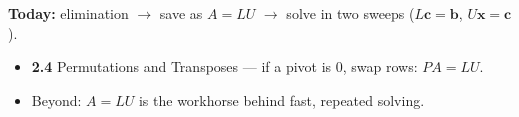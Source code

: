 \documentclass[aspectratio=169, 11pt]{beamer}
\newcommand{\xx}{\mathbf{x}}
\newcommand{\bb}{\mathbf{b}}
\newcommand{\cc}{\mathbf{c}}
\begin{document}
\begin{frame}[t, plain]
  \textbf{Today:} elimination $\to$ save as $A=LU$ $\to$ solve in two sweeps ($L\cc=\bb$, $U\xx=\cc$).\\[8pt]
  \begin{itemize}
    \setlength{\itemsep}{4pt}
    \item \textbf{2.4} Permutations and Transposes --- if a pivot is $0$, swap rows: $PA=LU$.
    \item Beyond: $A=LU$ is the workhorse behind fast, repeated solving.
  \end{itemize}
\end{frame}
\end{document}
